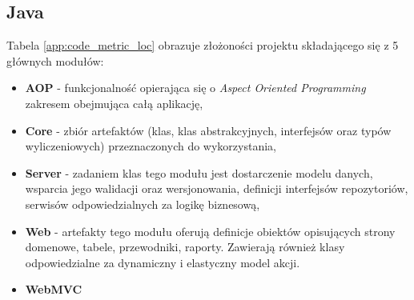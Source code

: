 \subsection{Java}
Tabela \ref{app:code_metric_loc} obrazuje złożoności projektu składającego się z 5 głównych modułów:
\begin{itemize}
	\item \textbf{AOP} - funkcjonalność opierająca się o \textit{Aspect Oriented Programming} zakresem obejmująca całą aplikację,
	\item \textbf{Core} - zbiór artefaktów (klas, klas abstrakcyjnych, interfejsów oraz typów wyliczeniowych) przeznaczonych do wykorzystania,
	\item \textbf{Server} - zadaniem klas tego modułu jest dostarczenie modelu danych, wsparcia jego walidacji oraz wersjonowania, definicji interfejsów repozytoriów, serwisów odpowiedzialnych za logikę biznesową,
	\item \textbf{Web} - artefakty tego modułu oferują definicje obiektów opisujących strony domenowe, tabele, przewodniki, raporty. Zawierają również klasy odpowiedzialne za
	dynamiczny i elastyczny model akcji. 
	\item \textbf{WebMVC}
\end{itemize}	

